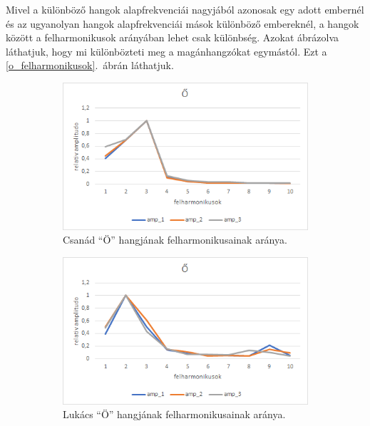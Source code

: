 \documentclass[a4paper,12pt]{article}
\begin{document}
Mivel a különböző hangok alapfrekvenciái nagyjából azonosak egy adott embernél és az ugyanolyan hangok alapfrekvenciái mások különböző embereknél, a hangok között a felharmonikusok arányában lehet csak különbség. Azokat ábrázolva láthatjuk, hogy mi különbözteti meg a magánhangzókat egymástól. Ezt a \ref{o_felharmonikusok}.\ ábrán láthatjuk.

\begin{figure}[h!]
\centering
\begin{subfigure}[t]{.5\linewidth}
\centering
\includegraphics[width = \linewidth]{csanad_o.png}
\caption{Csanád ``Ö'' hangjának felharmonikusainak aránya.}
\end{subfigure}%
\begin{subfigure}[t]{.5\linewidth}
\centering
\includegraphics[width = \linewidth]{lukacs_o.png}
\caption{Lukács ``Ö'' hangjának felharmonikusainak aránya.}
\end{subfigure}
\begin{subfigure}[t]{.5\linewidth}
\centering

\end{subfigure}
\end{figure}
\end{document}
